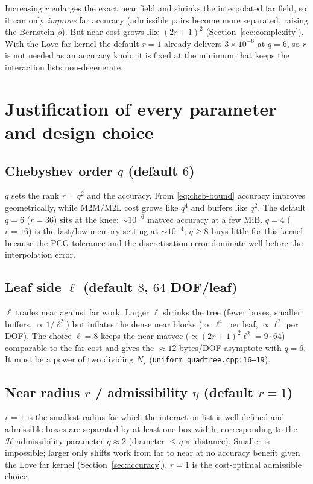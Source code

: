 \documentclass[11pt,a4paper]{article}
\newcommand{\Hmat}{\mathcal{H}}
\newcommand{\code}[1]{\texttt{#1}}
\theoremstyle{definition}
\theoremstyle{remark}
\begin{document}
Increasing $r$ enlarges the exact near field and shrinks the interpolated far
field, so it can only \emph{improve} far accuracy (admissible pairs become more
separated, raising the Bernstein $\rho$). But near cost grows like $(2r+1)^2$
(Section~\ref{sec:complexity}). With the Love far kernel the default $r=1$ already
delivers $3\times10^{-6}$ at $q=6$, so $r$ is not needed as an accuracy knob; it
is fixed at the minimum that keeps the interaction lists non-degenerate.

\section{Justification of every parameter and design choice}
\label{sec:params}

\subsection{Chebyshev order $q$ (default $6$)}
$q$ sets the rank $r=q^2$ and the accuracy. From \eqref{eq:cheb-bound} accuracy
improves geometrically, while M2M/M2L cost grows like $q^4$ and buffers like
$q^2$. The default $q=6$ ($r=36$) sits at the knee: $\sim10^{-6}$ matvec accuracy
at a few MiB. $q=4$ ($r=16$) is the fast/low-memory setting at $\sim10^{-4}$;
$q\ge8$ buys little for this kernel because the PCG tolerance and the discretisation
error dominate well before the interpolation error.

\subsection{Leaf side $\ell$ (default $8$, $64$ DOF/leaf)}
\label{sec:params-leaf}
$\ell$ trades near against far work. Larger $\ell$ shrinks the tree (fewer boxes,
smaller buffers, $\propto 1/\ell^2$) but inflates the dense near blocks
($\propto\ell^4$ per leaf, $\propto\ell^2$ per DOF). The choice $\ell=8$ keeps
the near matvec ($\propto(2r+1)^2\ell^2 = 9\cdot64$) comparable to the far cost
and gives the $\approx12$ bytes/DOF asymptote with $q=6$. It must be a power of
two dividing $N_s$ (\code{uniform\_quadtree.cpp:16--19}).

\subsection{Near radius $r$ / admissibility $\eta$ (default $r=1$)}
\label{sec:params-eta}
$r=1$ is the smallest radius for which the interaction list is well-defined and
admissible boxes are separated by at least one box width, corresponding to the
$\Hmat$ admissibility parameter $\eta\approx 2$ (diameter $\le \eta\times$
distance). Smaller is impossible; larger only shifts work from far to near at no
accuracy benefit given the Love far kernel (Section~\ref{sec:accuracy}). $r=1$ is
the cost-optimal admissible choice.
\end{document}

